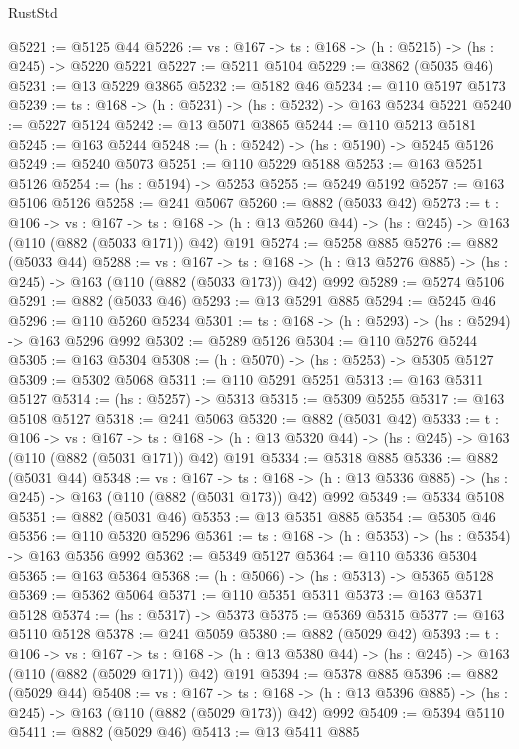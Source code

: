 \begin{lexlean}{RustStd}
\begin{coremodule}
@5221 := @5125 @44
@5226 := {vs : @167} -> {ts : @168} -> (h : @5215) -> (hs : @245) -> @5220 @5221
@5227 := @5211 @5104
@5229 := @3862 (@5035 @46)
@5231 := @13 @5229 @3865
@5232 := @5182 @46
@5234 := @110 @5197 @5173
@5239 := {ts : @168} -> (h : @5231) -> (hs : @5232) -> @163 @5234 @5221
@5240 := @5227 @5124
@5242 := @13 @5071 @3865
@5244 := @110 @5213 @5181
@5245 := @163 @5244
@5248 := (h : @5242) -> (hs : @5190) -> @5245 @5126
@5249 := @5240 @5073
@5251 := @110 @5229 @5188
@5253 := @163 @5251 @5126
@5254 := (hs : @5194) -> @5253
@5255 := @5249 @5192
@5257 := @163 @5106 @5126
@5258 := @241 @5067
@5260 := @882 (@5033 @42)
@5273 := {t : @106} ->
  {vs : @167} ->
  {ts : @168} -> (h : @13 @5260 @44) -> (hs : @245) -> @163 (@110 (@882 (@5033 @171)) @42) @191
@5274 := @5258 @885
@5276 := @882 (@5033 @44)
@5288 := {vs : @167} ->
  {ts : @168} -> (h : @13 @5276 @885) -> (hs : @245) -> @163 (@110 (@882 (@5033 @173)) @42) @992
@5289 := @5274 @5106
@5291 := @882 (@5033 @46)
@5293 := @13 @5291 @885
@5294 := @5245 @46
@5296 := @110 @5260 @5234
@5301 := {ts : @168} -> (h : @5293) -> (hs : @5294) -> @163 @5296 @992
@5302 := @5289 @5126
@5304 := @110 @5276 @5244
@5305 := @163 @5304
@5308 := (h : @5070) -> (hs : @5253) -> @5305 @5127
@5309 := @5302 @5068
@5311 := @110 @5291 @5251
@5313 := @163 @5311 @5127
@5314 := (hs : @5257) -> @5313
@5315 := @5309 @5255
@5317 := @163 @5108 @5127
@5318 := @241 @5063
@5320 := @882 (@5031 @42)
@5333 := {t : @106} ->
  {vs : @167} ->
  {ts : @168} -> (h : @13 @5320 @44) -> (hs : @245) -> @163 (@110 (@882 (@5031 @171)) @42) @191
@5334 := @5318 @885
@5336 := @882 (@5031 @44)
@5348 := {vs : @167} ->
  {ts : @168} -> (h : @13 @5336 @885) -> (hs : @245) -> @163 (@110 (@882 (@5031 @173)) @42) @992
@5349 := @5334 @5108
@5351 := @882 (@5031 @46)
@5353 := @13 @5351 @885
@5354 := @5305 @46
@5356 := @110 @5320 @5296
@5361 := {ts : @168} -> (h : @5353) -> (hs : @5354) -> @163 @5356 @992
@5362 := @5349 @5127
@5364 := @110 @5336 @5304
@5365 := @163 @5364
@5368 := (h : @5066) -> (hs : @5313) -> @5365 @5128
@5369 := @5362 @5064
@5371 := @110 @5351 @5311
@5373 := @163 @5371 @5128
@5374 := (hs : @5317) -> @5373
@5375 := @5369 @5315
@5377 := @163 @5110 @5128
@5378 := @241 @5059
@5380 := @882 (@5029 @42)
@5393 := {t : @106} ->
  {vs : @167} ->
  {ts : @168} -> (h : @13 @5380 @44) -> (hs : @245) -> @163 (@110 (@882 (@5029 @171)) @42) @191
@5394 := @5378 @885
@5396 := @882 (@5029 @44)
@5408 := {vs : @167} ->
  {ts : @168} -> (h : @13 @5396 @885) -> (hs : @245) -> @163 (@110 (@882 (@5029 @173)) @42) @992
@5409 := @5394 @5110
@5411 := @882 (@5029 @46)
@5413 := @13 @5411 @885

\end{coremodule}
\end{lexlean}

